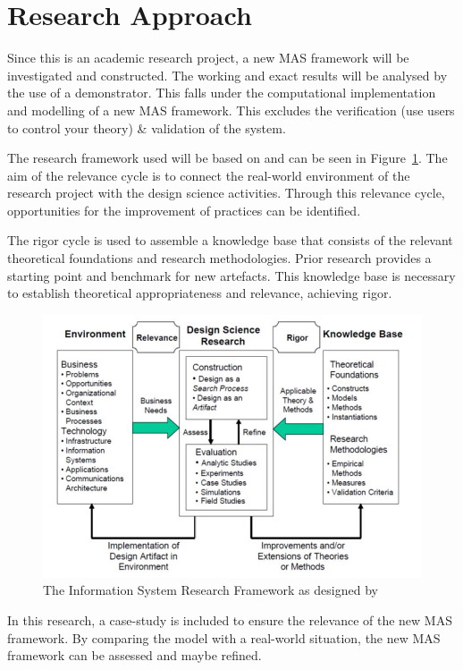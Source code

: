 \section{Research Approach}
Since this is an academic research project, a new MAS framework will be investigated and constructed. The working and exact results will be analysed by the use of a demonstrator. This falls under the computational implementation and modelling of a new MAS framework. This excludes the verification (use users to control your theory) \& validation of the system.  

The research framework used will be based on \cite{hevner2010design} and can be seen in Figure~\ref{fig:InformationSystemResearchFramework}. The aim of the relevance cycle is to connect the real-world environment of the research project with the design science activities. Through this relevance cycle, opportunities for the improvement of practices can be identified.

The rigor cycle is used to assemble a knowledge base that consists of the relevant theoretical foundations and research methodologies. Prior research provides a starting point and benchmark for new artefacts. This knowledge base is necessary to establish theoretical appropriateness and relevance, achieving rigor.

\begin{figure}
	\centering
	\includegraphics[width=0.7\linewidth]{./img/InformationSystemResearchFramework.jpg}
	\caption{The Information System Research Framework as designed by \cite{hevner2010design}}
	\label{fig:InformationSystemResearchFramework}
\end{figure}

In this research, a case-study is included to ensure the relevance of the new MAS framework. By comparing the model with a real-world situation, the new MAS framework can be assessed and maybe refined.

